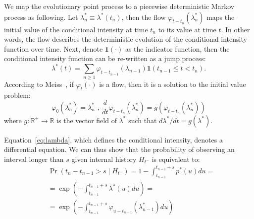 \documentclass{juliacon}
\numberwithin{equation}{section}
\begin{document}
We map the evolutionary point process to a piecewise deterministic Markov process as following. Let \( \lambda^\ast_n \equiv \lambda^\ast(t_n) \), then the flow \( \varphi_{t-t_n}( \lambda^\ast_n ) \) maps the initial value of the conditional intensity at time \( t_n \) to its value at time \( t \). In other words, the flow describes the deterministic evolution of the conditional intensity function over time. Next, denote \( \mathbf{1}( \cdot ) \) as the indicator function, then the conditional intensity function can be re-written as a jump process:
\begin{equation} \label{eqn:conditional-jump}
  \lambda^\ast (t) = \sum_{n \geq 1} \varphi_{t - t_{n-1}} ( \lambda_{n-1} ) \mathbf{1}(t_{n-1} \leq t < t_n).
\end{equation}
According to Meiss~\cite{meiss2017}, if \( \varphi_t ( \cdot ) \) is a flow, then it is a solution to the initial value problem:
\begin{equation}
  \varphi_{0} (\lambda_n^\ast) = \lambda_n^\ast \text{ , }
  \frac{d}{dt} \varphi_{t-t_n} (\lambda_n^\ast) = g(\varphi_{t-t_n} (\lambda_n^\ast))
\end{equation}
where \( g: \mathbb{R}^+ \to \mathbb{R} \) is the vector field of \( \lambda^\ast \) such that \( d \lambda^\ast / dt = g( \lambda^\ast ) \).

Equation~\ref{eq:lambda}, which defines the conditional intensity, denotes a differential equation. We can thus show that the probability of observing an interval longer than \( s \) given internal history \( H_{t^-} \) is equivalent to:
\begin{equation} \label{eqn:transition-rate}
\begin{split}
  &\Pr(t_n - t_{n-1} > s \mid H_{t^-}) = 1 - \int_{t_{n-1}}^{t_{n-1} + s} p^\ast(u) du = \\
    &=\exp \left( -\int_{t_{n-1}}^{t_{n-1} + s} \lambda^\ast (u) du \right) = \\ 
    &=\exp \left( -\int_{t_{n-1}}^{t_{n-1} + s} \varphi_{u-t_{n-1}} (\lambda_{n-1}^\ast) du \right)
\end{split}
\end{equation}
\end{document}
